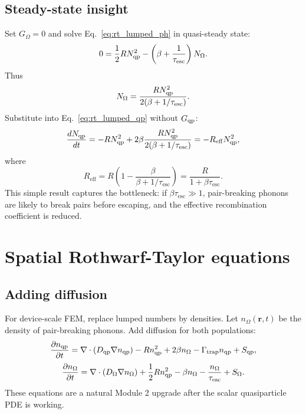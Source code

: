 \documentclass[11pt]{article}
\newcommand{\br}{{\bm{r}}}
\newcommand{\esc}{\mathrm{esc}}
\newcommand{\trap}{\mathrm{trap}}
\newcommand{\eff}{\mathrm{eff}}
\begin{document}
\subsection{Steady-state insight}
Set $G_\Omega=0$ and solve Eq.~\eqref{eq:rt_lumped_ph} in quasi-steady state:
\begin{equation}
0=\frac{1}{2}R N_{\qp}^2-\left(\beta+\frac{1}{\tau_{\esc}}\right)N_\Omega.
\end{equation}
Thus
\begin{equation}
N_\Omega=\frac{R N_{\qp}^2}{2(\beta+1/\tau_{\esc})}.
\end{equation}
Substitute into Eq.~\eqref{eq:rt_lumped_qp} without $G_{\mathrm{qp}}$:
\begin{equation}
\frac{dN_{\qp}}{dt}=-R N_{\qp}^2+2\beta\frac{R N_{\qp}^2}{2(\beta+1/\tau_{\esc})}
=-R_{\eff}N_{\qp}^2,
\end{equation}
where
\begin{equation}
R_{\eff}=R\left(1-\frac{\beta}{\beta+1/\tau_{\esc}}\right)
=\frac{R}{1+\beta\tau_{\esc}}.
\end{equation}
This simple result captures the bottleneck: if $\beta\tau_{\esc}\gg1$, pair-breaking phonons are likely to break pairs before escaping, and the effective recombination coefficient is reduced.

\section{Spatial Rothwarf-Taylor equations}

\subsection{Adding diffusion}
For device-scale FEM, replace lumped numbers by densities. Let $n_{\Omega}(\br,t)$ be the density of pair-breaking phonons. Add diffusion for both populations:
\begin{equation}
\frac{\partial n_{\qp}}{\partial t}
=\nabla\cdot(D_{\qp}\nabla n_{\qp})
-R n_{\qp}^2+2\beta n_{\Omega}
-\Gamma_{\trap}n_{\qp}+S_{\qp},
\label{eq:spatial_rt_qp}
\end{equation}
\begin{equation}
\frac{\partial n_{\Omega}}{\partial t}
=\nabla\cdot(D_{\Omega}\nabla n_{\Omega})
+\frac{1}{2}R n_{\qp}^2-\beta n_{\Omega}
-\frac{n_{\Omega}}{\tau_{\esc}}
+S_{\Omega}.
\label{eq:spatial_rt_ph}
\end{equation}
These equations are a natural Module 2 upgrade after the scalar quasiparticle PDE is working.
\end{document}
